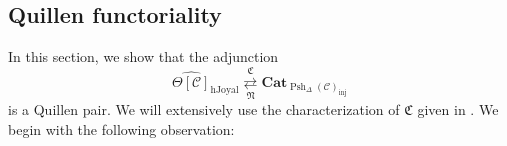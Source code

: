 \documentclass[leqno]{article}
\numberwithin{equation}{subsection}
\theoremstyle{plain}   %
\newtheorem{prop}[equation]{Proposition}
\newtheorem{cor}[equation]{Corollary}
\theoremstyle{remark}
\theoremstyle{plain}
\newcommand{\Nec}{\ensuremath{{\mathcal{N}ec}}}
\newcommand{\Cat}{\ensuremath{\mathbf{Cat}}}
\newcommand{\overcat}[2]{{\left(#1\downarrow #2\right)}}
\providecommand{\C}{}
\renewcommand{\C}{\ensuremath{\mathcal{C}}}
\newcommand{\cellset}{\ensuremath{\widehat{\Theta[\mathcal{C}]}}}
\newcommand{\spsh}{\ensuremath{\operatorname{Psh}_\Delta(\mathcal{C})}}
\begin{document}
\begin{comment}
		When \(\mathcal{G}\) is closed under wedges, we can define the \(\spsh\)-enriched category \(\mathfrak{C}^{\mathcal{G}}(X)	\) to be the category whose objects are the vertices of \(X\) and whose Hom-objects are
		\[\mathfrak{C}^{\mathcal{G}}(X)(x,y)_\cdot.\]
		This defines an enriched category by taking the composition operation to be concatenation of gadgets, which works since \	(\mathcal{G}\) is closed under wedges.
	\end{defn}
	\begin{prop}\label{gadgetlemma}
		Given a \(\C\)-cellular set \(X\) and two vertices \(x,y\) of \(X\) and a category of gadgets \(\mathcal{G}\) the map \	[N\overcat{\Nec^\mathbf{sp}_c}{X_{x,y}} \hookrightarrow N\overcat{\mathcal{G}_c}{X_{x,y}}\] is a weak homotopy 	equivalence.
	\end{prop}
	\begin{proof}
		By Quillen's theorem A, it suffices to look at the overcategories \(\overcat{\Nec^\mathbf{sp}_c}{G(c)}\) along the 	inclusion \(\Nec^\mathbf{sp}_c\hookrightarrow \mathcal{G}_c\) for all \(G\) in \(\mathcal{G}\) and show that their nerves 	are contractible, but these overcategories correspond on-the-nose to the subcategories classifying the diagonal component 	of \(\mathfrak{C}^\Nec(G)(\alpha,\omega)\), which is contractible because \(G\) is a gadget.
	\end{proof}
	\begin{cor}
		The constructions \(\mathfrak{C}^\Nec\) and \(\mathfrak{C}^\mathcal{G}\) are naturally weakly equivalent when \(\mathcal	{G}\) is closed under wedges.
	\end{cor}
	\begin{proof}
		The map between the two constructions is the identity on objects and induces Hom-wise weak equivalences of simplicial 	presheaves.
	\end{proof}
\end{comment}


\subsection{Quillen functoriality}
In this section, we show that the adjunction \[\cellset_{\mathrm{hJoyal}} \underset{\mathfrak{N}}{\overset{\mathfrak{C}}{\rightleftarrows}} \Cat_{\spsh_{\mathrm{inj}}}\] is a Quillen pair. We will extensively use the characterization of \(\mathfrak{C}\) given in .  We begin with the following observation:
\end{document}
